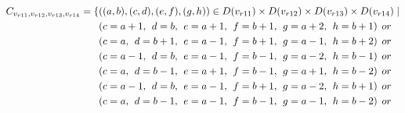 \begin{align*}
\Const{r11}{r12}{r13}{r14}=\{&((a,b),(c,d),(e,f),(g,h))\in \Domain{r11}\times \Domain{r12}\times\Domain{r13}\times\Domain{r14}\mid\\
&(c = a + 1,\hspace{1ex}d = b,\hspace{1ex}e = a + 1, \hspace{1ex}f = b+1,\hspace{1ex}g=a+2,\hspace{1ex}h=b+1)\hspace{1ex} or\\
&(c = a,\hspace{1ex}d = b+1,\hspace{1ex}e = a-1, \hspace{1ex}f = b+1,\hspace{1ex}g=a-1,\hspace{1ex}h=b+2)\hspace{1ex} or\\
&(c = a-1,\hspace{1ex}d = b,\hspace{1ex}e = a-1,\hspace{1ex} f = b-1,\hspace{1ex}g=a-2,\hspace{1ex}h=b-1)\hspace{1ex} or\\
&(c = a,\hspace{1ex}d = b-1,\hspace{1ex}e = a+1, \hspace{1ex}f = b-1,\hspace{1ex}g=a+1,\hspace{1ex}h=b-2)\hspace{1ex} or\\
&(c = a-1,\hspace{1ex}d = b,\hspace{1ex}e = a-1, \hspace{1ex}f = b+1,\hspace{1ex}g=a-2,\hspace{1ex}h=b+1)\hspace{1ex} or\\
&(c = a,\hspace{1ex}d = b-1,\hspace{1ex}e = a-1, \hspace{1ex}f = b-1,\hspace{1ex}g=a-1,\hspace{1ex}h=b-2)\hspace{1ex} or\\

\end{align*}
